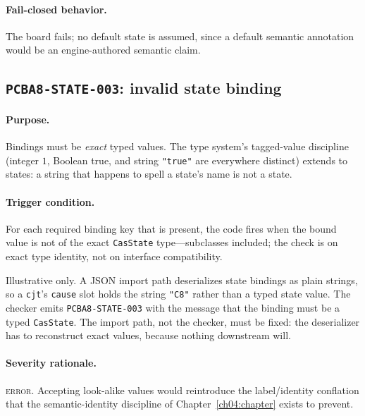 \paragraph{Fail-closed behavior.} The board fails; no default state is assumed, since a default semantic annotation would be an engine-authored semantic claim.

\subsection{\texttt{PCBA8-STATE-003}: invalid state binding}\label{ch07:sub:state003}

\paragraph{Purpose.} Bindings must be \emph{exact} typed values. The type system's tagged-value discipline (integer $1$, Boolean true, and string \texttt{"true"} are everywhere distinct) extends to states: a string that happens to spell a state's name is not a state.

\paragraph{Trigger condition.} For each required binding key that is present, the code fires when the bound value is not of the exact \texttt{CasState} type---subclasses included; the check is on exact type identity, not on interface compatibility.

\begin{example}\label{ch07:ex:state003}
Illustrative only. A JSON import path deserializes state bindings as plain strings, so a \texttt{cjt}'s \texttt{cause} slot holds the string \texttt{"C8"} rather than a typed state value. The checker emits \texttt{PCBA8-STATE-003} with the message that the binding must be a typed \texttt{CasState}. The import path, not the checker, must be fixed: the deserializer has to reconstruct exact values, because nothing downstream will.
\end{example}

\paragraph{Severity rationale.} \textsc{error}. Accepting look-alike values would reintroduce the label/identity conflation that the semantic-identity discipline of Chapter~\ref{ch04:chapter} exists to prevent.

